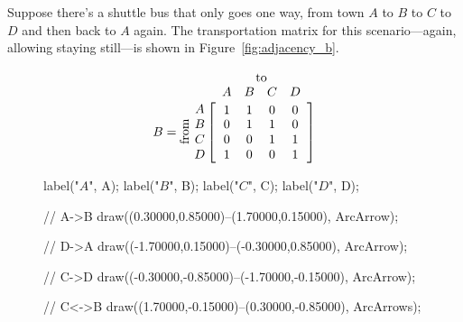\documentclass[../textbook.tex]{subfiles}
\begin{document}
Suppose there's a shuttle bus that only goes one way, from town $A$ to $B$ to $C$ to $D$ and then back to $A$ again. The transportation matrix for this scenario---again, allowing staying still---is shown in Figure~\ref{fig:adjacency_b}.

\begin{figure}[h]
	\begin{center}
		\begin{minipage}[b]{0.45\textwidth}
			\centering
			$$B=\rotatebox[origin=c]{90}{from}\;\,
			  \begin{array}{@{}c@{}}
			    \rowind{A} \\ \rowind{B} \\ \rowind{C} \\ \rowind{D}
			  \end{array}
			  \mathop{\left[
			  \begin{array}{cccc}
			     \colind{1}{A}  &  \colind{1}{B}  &  \colind{0}{C}  & \colind{0}{D} \\
			0 & 1 & 1 & 0 \\
			0 & 0 & 1 & 1 \\
			1 & 0 & 0 & 1 \\
			  \end{array}
			  \right]}^{
			  \begin{array}{@{}c@{}}
			    \rowind{\text{to}} \\ \mathstrut
			  \end{array}
			  }$$
			\vspace*{0.5\baselineskip}
		\end{minipage}
		\hfill
		\begin{minipage}[b]{0.45\textwidth}
			\centering
			\begin{asy}[width=0.7\textwidth]

				label("$A$", A);
				label("$B$", B);
				label("$C$", C);
				label("$D$", D);

				// A->B
				draw((0.30000,0.85000)--(1.70000,0.15000), ArcArrow);

				// D->A
				draw((-1.70000,0.15000)--(-0.30000,0.85000), ArcArrow);

				// C->D
				draw((-0.30000,-0.85000)--(-1.70000,-0.15000), ArcArrow);

				// C<->B
				draw((1.70000,-0.15000)--(0.30000,-0.85000), ArcArrows);


\end{asy}
\end{minipage}
\end{center}
\end{figure}
\end{document}
